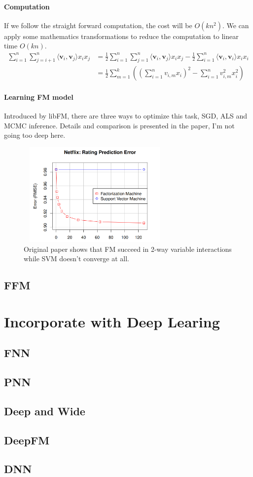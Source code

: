 \documentclass{article}
\begin{document}
\paragraph{Computation}
If we follow the straight forward computation, the cost will be $O(kn^{2})$. We can apply some mathematics transformations to reduce the computation to linear time $O(kn)$.
\begin{align*}
\sum_{i=1}^{n}\sum_{j=i+1}^{n}\langle \textbf{v}_{i} ,\textbf{v}_{j} \rangle x_{i}x_{j}
&= \frac{1}{2} \sum_{i=1}^{n}\sum_{j=1}^{n}\langle \textbf{v}_{i} ,\textbf{v}_{j} \rangle x_{i}x_{j} -\frac{1}{2}\sum_{i=1}^{n}\langle \textbf{v}_{i} ,\textbf{v}_{i} \rangle x_{i}x_{i} \\
&= \frac{1}{2}\sum_{m=1}^{k}\left( \left(\sum_{i=1}^{n}v_{i,m}x_{i}\right)^{2} -\sum_{i=1}^{n}v_{i,m}^{2}x_{i}^{2} \right)
\end{align*}

\paragraph{Learning FM model} Introduced by libFM\cite{DBLP:journals/tist/Rendle12}, there are three ways to optimize this task, SGD, ALS and MCMC inference. Details and comparison is presented in the paper, I'm not going too deep here.

\begin{figure}[H]
\centering
\includegraphics[width=3in,height=2in]{figure3}
\caption{Original paper shows that FM succeed in 2-way variable interactions while SVM doesn't converge at all.}
\end{figure}
\subsection{FFM}
\section{Incorporate with Deep Learing}
\subsection{FNN}
\subsection{PNN}
\subsection{Deep and Wide}
\subsection{DeepFM}
\subsection{DNN}



\end{document}
